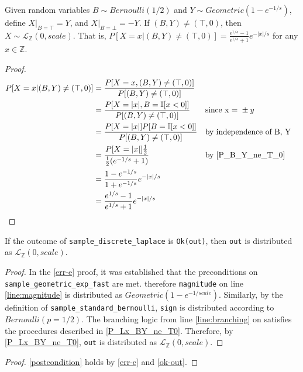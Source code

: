 \documentclass{article}
\begin{document}
\begin{lemma}\cite{CKS20}\label{P_Lx_BY_ne_T0}
    Given random variables $B \sim Bernoulli(1/2)$ and $Y \sim Geometric(1 - e^{-1/s})$, define $X|_{B=\top} = Y$, and $X|_{B=\bot} = -Y$. 
    If $(B, Y) \neq (\top, 0)$, then $X \sim \mathcal{L}_\mathbb{Z}(0, scale)$. 
    That is, $P[X = x | (B, Y) \neq (\top, 0)] = \frac{e^{1/s} - 1}{e^{1/s} + 1} e^{-|x|/s}$ for any $x \in \mathbb{Z}$.
\end{lemma}

\begin{proof}
\begin{align*}
P[X = x | (B, Y) \neq (\top, 0)] &= \frac{P[X = x, (B, Y) \neq (\top, 0)]}{P[(B, Y) \neq (\top, 0)]} \\
    &= \frac{P[X = |x|, B = \mathbb{I}[x < 0]]}{P[(B, Y) \neq (\top, 0)]} && \text{since x = }\pm y \\
    &= \frac{P[X = |x|] P[B = \mathbb{I}[x < 0]]}{P[(B, Y) \neq (\top, 0)]} && \text{by independence of B, Y} \\
    &= \frac{P[X = |x|] \frac{1}{2}}{\frac{1}{2} (e^{-1/s} + 1)} && \text{by } \ref{P_B_Y_ne_T_0} \\
    &= \frac{1 - e^{-1/s}}{1 + e^{-1/s}} e^{-|x|/s} \\
    &= \frac{e^{1/s} - 1}{e^{1/s} + 1} e^{-|x|/s} \\
\end{align*}
\end{proof}

\begin{lemma}\label{ok-out}
    If the outcome of \texttt{sample\_discrete\_laplace} is \texttt{Ok(out)}, 
    then \texttt{out} is distributed as $\mathcal{L}_\mathbb{Z}(0, scale)$.
\end{lemma}

\begin{proof}
    In the \ref{err-e} proof, it was established that the preconditions on \texttt{sample\_geometric\_exp\_fast} are met.
    therefore \texttt{magnitude} on line \ref{line:magnitude} is distributed as $ Geometric(1 - e^{-1/scale})$.
    Similarly, by the definition of \texttt{sample\_standard\_bernoulli}, \texttt{sign} is distributed according to $Bernoulli(p=1/2)$.
    The branching logic from line \ref{line:branching} on satisfies the procedures described in \ref{P_Lx_BY_ne_T0}.
    Therefore, by \ref{P_Lx_BY_ne_T0}, \texttt{out} is distributed as $\mathcal{L}_\mathbb{Z}(0, scale)$.
\end{proof}

\begin{proof}
    \ref{postcondition} holds by \ref{err-e} and \ref{ok-out}.
\end{proof}




\end{document}

